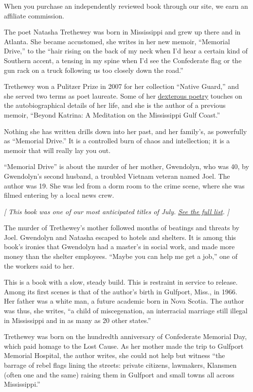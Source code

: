 When you purchase an independently reviewed book through our site, we
earn an affiliate commission.

The poet Natasha Trethewey was born in Mississippi and grew up there and
in Atlanta. She became accustomed, she writes in her new memoir,
``Memorial Drive,'' to the ``hair rising on the back of my neck when I'd
hear a certain kind of Southern accent, a tensing in my spine when I'd
see the Confederate flag or the gun rack on a truck following us too
closely down the road.''

Trethewey won a Pulitzer Prize in 2007 for her collection ``Native
Guard,'' and she served two terms as poet laureate. Some of her
\href{https://www.nytimes.com/2018/11/13/books/review-monument-natasha-trethewey.html}{dexterous
poetry} touches on the autobiographical details of her life, and she is
the author of a previous memoir, ``Beyond Katrina: A Meditation on the
Mississippi Gulf Coast.''

Nothing she has written drills down into her past, and her family's, as
powerfully as ``Memorial Drive.'' It is a controlled burn of chaos and
intellection; it is a memoir that will really lay you out.

``Memorial Drive'' is about the murder of her mother, Gwendolyn, who was
40, by Gwendolyn's second husband, a troubled Vietnam veteran named
Joel. The author was 19. She was led from a dorm room to the crime
scene, where she was filmed entering by a local news crew.

\emph{{[} This book was one of our most anticipated titles of July.}
\href{https://www.nytimes.com/2020/06/24/books/new-july-books.html}{\emph{See
the full list}}\emph{. {]}}

The murder of Trethewey's mother followed months of beatings and threats
by Joel. Gwendolyn and Natasha escaped to hotels and shelters. It is
among this book's ironies that Gwendolyn had a master's in social work,
and made more money than the shelter employees. ``Maybe you can help me
get a job,'' one of the workers said to her.

This is a book with a slow, steady build. This is restraint in service
to release. Among its first scenes is that of the author's birth in
Gulfport, Miss., in 1966. Her father was a white man, a future academic
born in Nova Scotia. The author was thus, she writes, ``a child of
miscegenation, an interracial marriage still illegal in Mississippi and
in as many as 20 other states.''

Trethewey was born on the hundredth anniversary of Confederate Memorial
Day, which paid homage to the Lost Cause. As her mother made the trip to
Gulfport Memorial Hospital, the author writes, she could not help but
witness ``the barrage of rebel flags lining the streets: private
citizens, lawmakers, Klansmen (often one and the same) raising them in
Gulfport and small towns all across Mississippi.''

